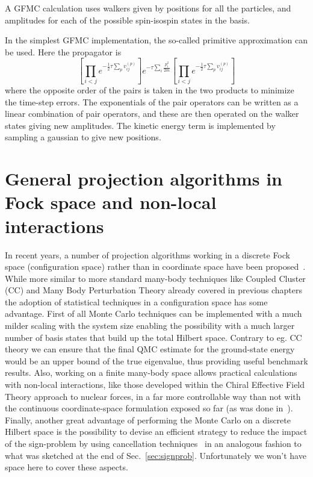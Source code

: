  A GFMC calculation uses walkers given by positions for all the
 particles, and amplitudes for each of the possible spin-isospin
 states in the basis.
 
 In the simplest GFMC implementation, the so-called primitive approximation
 can be used. Here the propagator is 
 \begin{equation}
 \left [
 \prod_{i<j} e^{-\tfrac{1}{2}\tau \sum_p v^{(p)}_{ij}} 
 \right ]
 e^{-\tau \sum_i \frac{p_i^2}{2m}}
 \left [
 \prod_{i<j} e^{-\tfrac{1}{2}\tau \sum_p v^{(p)}_{ij}} 
 \right ]
 \end{equation}
 where the opposite order of the pairs is taken in the two products
 to minimize the time-step errors. The exponentials of the pair operators
 can be written as a linear combination of pair operators, and these
 are then operated on the walker states giving new amplitudes. The
 kinetic energy term is implemented by sampling a gaussian to give new
 positions.
 

\section{General projection algorithms in Fock space and non-local interactions}
In recent years, a number of projection algorithms working in a discrete Fock space (configuration 
space) rather than in coordinate space have been proposed~\cite{Booth09,Cleland10,Petruzielo12,Booth13,Mukherjee13,Roggero13}. While more similar to
more standard many-body techniques like Coupled Cluster (CC) and Many Body Perturbation Theory already covered in previous chapters
the adoption of statistical techniques in a configuration space has some advantage. First of all
Monte Carlo techniques can be implemented with a much milder scaling with the system size enabling the
possibility with a much larger number of basis states that build up the total Hilbert space. Contrary
to eg. CC theory we can ensure that the final QMC estimate for the ground-state energy would
be an upper bound of the true eigenvalue, thus providing useful benchmark results. Also, working 
on a finite many-body space allows practical calculations with non-local interactions, like those developed 
within the Chiral Effective Field Theory approach to nuclear forces, in a far more controllable way than not 
with the continuous coordinate-space formulation exposed so far (as was done in~\cite{Roggero14}).
Finally, another great advantage of performing the Monte Carlo on a discrete Hilbert space is the possibility to
devise an efficient strategy to reduce the impact of the sign-problem by using cancellation techniques~\cite{Booth09,Cleland10,Petruzielo12}
in an analogous fashion to what was sketched at the end of Sec.~\ref{sec:signprob}. Unfortunately we won't have space here to cover these aspects.

